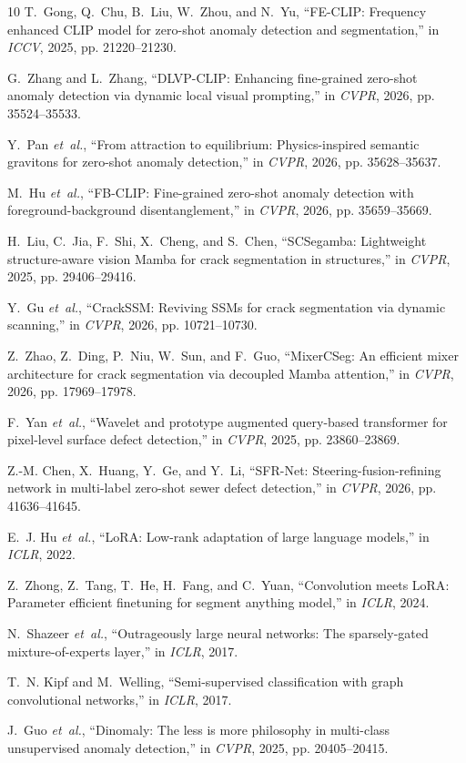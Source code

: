 \documentclass[conference]{IEEEtran}
\begin{document}
\begin{thebibliography}{10}
T.~Gong, Q.~Chu, B.~Liu, W.~Zhou, and N.~Yu, ``{FE-CLIP}: Frequency enhanced {CLIP} model for zero-shot anomaly detection and segmentation,'' in \emph{ICCV}, 2025, pp. 21220--21230.

G.~Zhang and L.~Zhang, ``{DLVP-CLIP}: Enhancing fine-grained zero-shot anomaly detection via dynamic local visual prompting,'' in \emph{CVPR}, 2026, pp. 35524--35533.

Y.~Pan \emph{et~al.}, ``From attraction to equilibrium: Physics-inspired semantic gravitons for zero-shot anomaly detection,'' in \emph{CVPR}, 2026, pp. 35628--35637.

M.~Hu \emph{et~al.}, ``{FB-CLIP}: Fine-grained zero-shot anomaly detection with foreground-background disentanglement,'' in \emph{CVPR}, 2026, pp. 35659--35669.

H.~Liu, C.~Jia, F.~Shi, X.~Cheng, and S.~Chen, ``{SCSegamba}: Lightweight structure-aware vision {Mamba} for crack segmentation in structures,'' in \emph{CVPR}, 2025, pp. 29406--29416.

Y.~Gu \emph{et~al.}, ``{CrackSSM}: Reviving {SSMs} for crack segmentation via dynamic scanning,'' in \emph{CVPR}, 2026, pp. 10721--10730.

Z.~Zhao, Z.~Ding, P.~Niu, W.~Sun, and F.~Guo, ``{MixerCSeg}: An efficient mixer architecture for crack segmentation via decoupled {Mamba} attention,'' in \emph{CVPR}, 2026, pp. 17969--17978.

F.~Yan \emph{et~al.}, ``Wavelet and prototype augmented query-based transformer for pixel-level surface defect detection,'' in \emph{CVPR}, 2025, pp. 23860--23869.

Z.-M. Chen, X.~Huang, Y.~Ge, and Y.~Li, ``{SFR-Net}: Steering-fusion-refining network in multi-label zero-shot sewer defect detection,'' in \emph{CVPR}, 2026, pp. 41636--41645.

E.~J. Hu \emph{et~al.}, ``{LoRA}: Low-rank adaptation of large language models,'' in \emph{ICLR}, 2022.

Z.~Zhong, Z.~Tang, T.~He, H.~Fang, and C.~Yuan, ``Convolution meets {LoRA}: Parameter efficient finetuning for segment anything model,'' in \emph{ICLR}, 2024.

N.~Shazeer \emph{et~al.}, ``Outrageously large neural networks: The sparsely-gated mixture-of-experts layer,'' in \emph{ICLR}, 2017.

T.~N. Kipf and M.~Welling, ``Semi-supervised classification with graph convolutional networks,'' in \emph{ICLR}, 2017.

J.~Guo \emph{et~al.}, ``{Dinomaly}: The less is more philosophy in multi-class unsupervised anomaly detection,'' in \emph{CVPR}, 2025, pp. 20405--20415.

\end{thebibliography}
\end{document}
